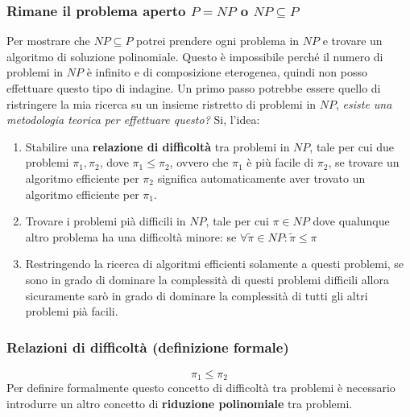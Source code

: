 \documentclass{article}
\begin{document}
\subsubsection{Rimane il problema aperto $P=NP$ o $NP\subseteq P$}
Per mostrare che $NP\subseteq P$ potrei prendere ogni problema in $NP$ e trovare
un algoritmo di soluzione polinomiale. Questo è impossibile perché il numero
di problemi in $NP$ è infinito e di composizione eterogenea, quindi non posso effettuare
questo tipo di indagine.
\newline\newline
Un primo passo potrebbe essere quello di ristringere la mia ricerca su un insieme ristretto
di problemi in $NP$, \textit{esiste una metodologia teorica per effettuare questo?} Si,
l'idea:
\begin{enumerate}
    \item Stabilire una \textbf{relazione di difficoltà} tra problemi in $NP$, tale
          per cui due problemi $\pi_1,\pi_2$, dove $\pi_1\leq\pi_2$, ovvero che $\pi_1$ è
          più facile di $\pi_2$, se trovare un algoritmo efficiente per $\pi_2$ significa
          automaticamente aver trovato un algoritmo efficiente per $\pi_1$.

    \item Trovare i problemi pià difficili in $NP$, tale per cui $\pi\in NP$
          dove qualunque altro problema ha una difficoltà minore: se $\forall\tilde{\pi}\in NP:\tilde{\pi}\leq\pi$

    \item Restringendo la ricerca di algoritmi efficienti solamente a questi problemi, se sono
          in grado di dominare la complessità di questi problemi difficili allora sicuramente
          sarò in grado di dominare la complessità di tutti gli altri problemi pià facili.
\end{enumerate}

\subsubsection{Relazioni di difficoltà (definizione formale)}
$$\pi_1\leq\pi_2$$
Per definire formalmente questo concetto di difficoltà tra problemi è necessario introdurre
un altro concetto di \textbf{riduzione polinomiale} tra problemi.
\end{document}
